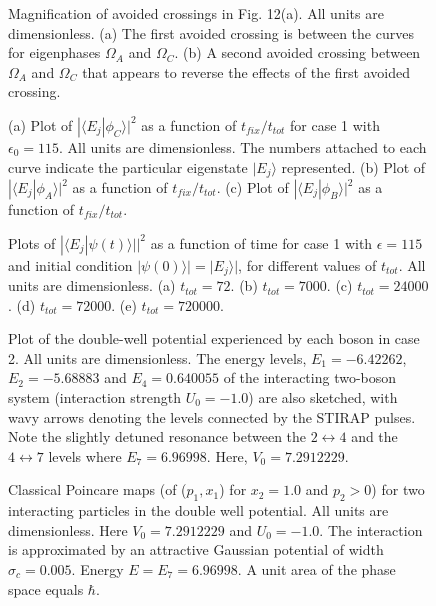 \documentclass{article}
\begin{document}
\begin{figure} 
\caption{Magnification of avoided crossings in Fig. 12(a). All units are dimensionless. (a) The first avoided crossing is  between the curves for  eigenphases  $\Omega_A$ and $\Omega_C$. (b) A second avoided crossing between $\Omega_A$ and $\Omega_C$ that appears to reverse the effects of the first avoided crossing.}
\label{fig:e_115avcrossing}
\end{figure}

\begin{figure} 
\caption{(a) Plot of $|{\langle}E_j|{\phi}_C{\rangle}|^2$ as a function of $t_{fix}/t_{tot}$ for case 1 with ${\epsilon}_0=115$. All units are dimensionless.  The numbers attached to each curve indicate the particular eigenstate $|E_j{\rangle}$ represented.  (b) Plot of $|{\langle}E_j|{\phi}_A{\rangle}|^2$ as a function of $t_{fix}/t_{tot}$. (c) Plot of $|{\langle}E_j|{\phi}_B{\rangle}|^2$ as a function of $t_{fix}/t_{tot}$.}
\label{fig:e_115states}
\end{figure}

\begin{figure} 
\caption{Plots of $|{\langle}E_j|{\psi}(t){\rangle|}|^2$ as a function of time for case 1 with $\epsilon=115$  and initial condition $|{\psi}(0){\rangle|}=|E_j{\rangle|}$, for different values of  $t_{tot}$. All units are dimensionless. (a) $t_{tot}=72$. (b) $t_{tot}=7000$. (c) $t_{tot}=24000$. (d) $t_{tot}=72000$. (e) $t_{tot}=720000$.}
\label{fig:e_115timeev}
\end{figure}

\clearpage

\begin{figure} 
\caption{Plot of the double-well potential experienced by each boson in case 2. All units are dimensionless. The energy levels, $E_1=-6.42262$, $E_2=-5.68883$ and $E_4=0.640055$  of the interacting two-boson system (interaction strength  $U_0=-1.0$) are also sketched, with wavy arrows denoting the levels connected by the STIRAP pulses. Note the slightly detuned resonance between the $2 \leftrightarrow 4$ and the $4 \leftrightarrow 7$ levels where $E_7=6.96998$. Here, $V_0=7.2912229$.}
\label{fig:doublewell_case02}
\end{figure}

\begin{figure} 
\caption{Classical Poincare maps (of  ($p_1,x_1$) for $x_2=1.0$ and $p_2>0$) for two interacting particles in the double well potential. All units are dimensionless. Here $V_0 = 7.2912229$ and $U_0 = -1.0 $. The interaction is approximated by an attractive Gaussian  potential of width $\sigma_c = 0.005$. Energy $E=E_7=6.96998$. A unit area of the phase space equals $\hbar$.}
\label{fig:classicalpncr_case02}
\end{figure}
\end{document}
